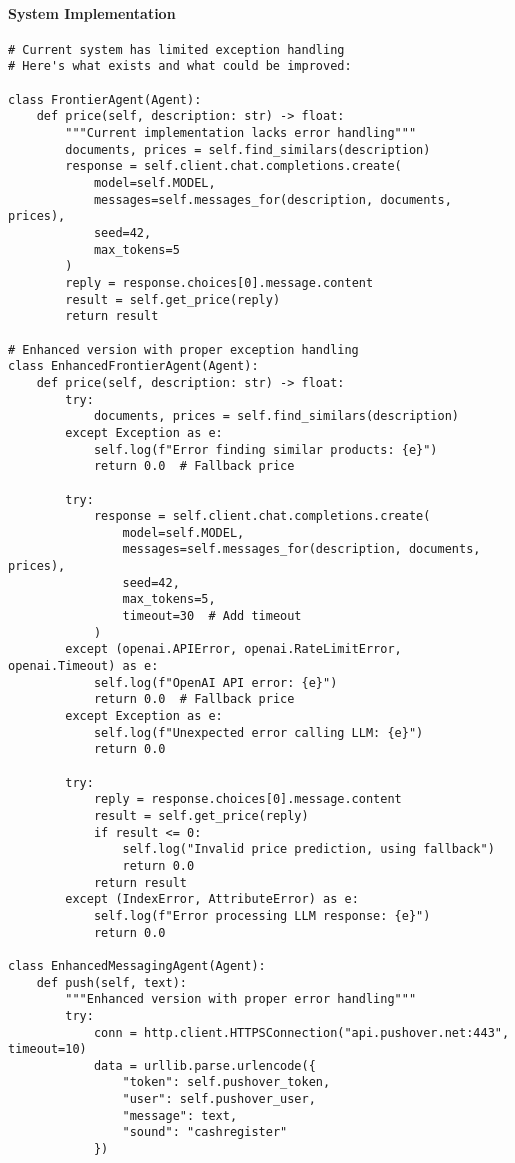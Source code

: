 \paragraph{System Implementation}
\begin{lstlisting}[caption=Exception Handling in Agent System (Current and Potential)]
# Current system has limited exception handling
# Here's what exists and what could be improved:

class FrontierAgent(Agent):
    def price(self, description: str) -> float:
        """Current implementation lacks error handling"""
        documents, prices = self.find_similars(description)
        response = self.client.chat.completions.create(
            model=self.MODEL, 
            messages=self.messages_for(description, documents, prices),
            seed=42,
            max_tokens=5
        )
        reply = response.choices[0].message.content
        result = self.get_price(reply)
        return result

# Enhanced version with proper exception handling
class EnhancedFrontierAgent(Agent):
    def price(self, description: str) -> float:
        try:
            documents, prices = self.find_similars(description)
        except Exception as e:
            self.log(f"Error finding similar products: {e}")
            return 0.0  # Fallback price
        
        try:
            response = self.client.chat.completions.create(
                model=self.MODEL, 
                messages=self.messages_for(description, documents, prices),
                seed=42,
                max_tokens=5,
                timeout=30  # Add timeout
            )
        except (openai.APIError, openai.RateLimitError, openai.Timeout) as e:
            self.log(f"OpenAI API error: {e}")
            return 0.0  # Fallback price
        except Exception as e:
            self.log(f"Unexpected error calling LLM: {e}")
            return 0.0
        
        try:
            reply = response.choices[0].message.content
            result = self.get_price(reply)
            if result <= 0:
                self.log("Invalid price prediction, using fallback")
                return 0.0
            return result
        except (IndexError, AttributeError) as e:
            self.log(f"Error processing LLM response: {e}")
            return 0.0

class EnhancedMessagingAgent(Agent):
    def push(self, text):
        """Enhanced version with proper error handling"""
        try:
            conn = http.client.HTTPSConnection("api.pushover.net:443", timeout=10)
            data = urllib.parse.urlencode({
                "token": self.pushover_token,
                "user": self.pushover_user,
                "message": text,
                "sound": "cashregister"
            })
            

\end{lstlisting}
